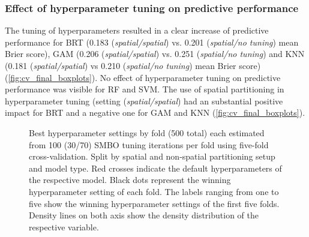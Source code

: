\documentclass[review]{elsarticle}
\begin{document}
\subsubsection{Effect of hyperparameter tuning on predictive performance}
The tuning of hyperparameters resulted in a clear increase of predictive performance for BRT (0.183 (\emph{spatial/spatial}) vs. 0.201 (\emph{spatial/no tuning}) mean Brier score), GAM (0.206 (\emph{spatial/spatial}) vs. 0.251 (\emph{spatial/no tuning}) and KNN (0.181 (\emph{spatial/spatial}) vs 0.210 (\emph{spatial/no tuning}) mean Brier score) (\autoref{fig:cv_final_boxplots}).
No effect of hyperparameter tuning on predictive performance was visible for RF and SVM.
The use of spatial partitioning in hyperparameter tuning (setting (\emph{spatial/spatial}) had an substantial positive impact for BRT and a negative one for GAM and KNN (\autoref{fig:cv_final_boxplots}).

\begin{figure} [H]
	\begin{center}
		\caption[]{Best hyperparameter settings by fold (500 total) each estimated from 100 (30/70) SMBO tuning iterations per fold using five-fold cross-validation. 
		Split by spatial and non-spatial partitioning setup and model type.
			Red crosses indicate the default hyperparameters of the respective model.
			Black dots represent the winning hyperparameter setting of each fold.
			The labels ranging from one to five show the winning hyperparameter settings of the first five folds.
			Density lines on both axis show the density distribution of the respective variable.}
		\label{fig:best_parameter_combs}
	\end{center}
\end{figure}
\end{document}
